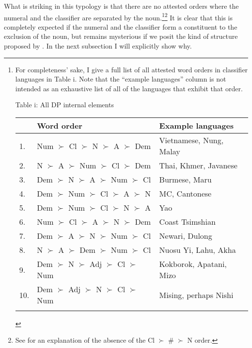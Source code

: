 \documentclass[output=paper
,modfonts
,nonflat]{langsci/langscibook}
\begin{document}
What is striking in this typology is that there are no attested orders where the numeral and the classifier are separated by the noun.\footnote{For completeness' sake, I give a full list of all attested word orders in classifier languages in Table i. Note that the ``example languages'' column is not intended as an exhaustive list of all of the languages that exhibit that order.\vspace{.5\baselineskip}

{\centering Table i: All DP internal elements\\
\hspace{0.10\textwidth} \begin{tabularx}{0.75\textwidth}{lXX}
	\lsptoprule
	&Word order&Example languages\\
	\midrule
	1.&Num $\succ$ Cl $\succ$ N $\succ$ A $\succ$ Dem& {Vietnamese}, {Nung}, {Malay}\\
	2.&N $\succ$ A $\succ$ Num $\succ$ Cl $\succ$ Dem& {Thai}, {Khmer}, {Javanese}\\
	3.&Dem $\succ$ N $\succ$ A $\succ$ Num $\succ$ Cl& {Burmese}, {Maru}\\
	4.&Dem $\succ$ Num $\succ$ Cl $\succ$ A $\succ$ N& MC, {Cantonese}\\
	5.&Dem $\succ$ Num $\succ$ Cl $\succ$ N $\succ$ A& {Yao}\\
	6.&Num $\succ$ Cl $\succ$ A $\succ$ N $\succ$ Dem& {Coast Tsimshian}\\
	7.&Dem $\succ$ A $\succ$ N $\succ$ Num $\succ$ Cl&{Newari}, {Dulong}\\
	8.&N $\succ$ A $\succ$ Dem $\succ$ Num $\succ$ Cl& {Nuosu Yi}, {Lahu}, Akha\\
	9.&Dem $\succ$ N $\succ$ Adj $\succ$ Cl $\succ$ Num & {Kokborok}, Apatani, {Mizo}\\
	10.&Dem $\succ$ Adj $\succ$ N $\succ$ Cl $\succ$ Num & {Mising}, perhaps {Nishi}\\ 
	\lspbottomrule
\end{tabularx}\vspace{.5\baselineskip}}}\tss{,}\footnote{See \citet[\S5, especially \S5.4.1]{Hall2015} for an explanation of the absence of the Cl $\succ$ \# $\succ$ N order.} It is clear that this is completely expected if the numeral and the classifier form a constituent to the exclusion of the noun, but remains mysterious if we posit the kind of structure proposed by \citet{Simpson2005}. In the next subsection I will explicitly show why.
\end{document}

